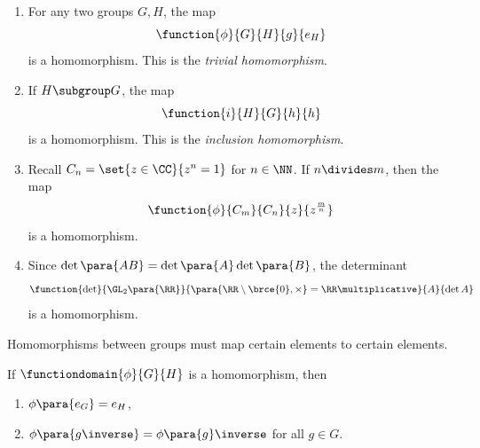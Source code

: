 \begin{examples}
    \begin{enumerate}
        \item For any two groups \(G, H\), the map
        \[
            \function{\phi}{G}{H}{g}{e_{H}}
        \]
        is a homomorphism. This is the \emph{trivial homomorphism}.
        
        \item If \(H \subgroup G\), the map
        \[
            \function{i}{H}{G}{h}{h}
        \]
        is a homomorphism. This is the \emph{inclusion homomorphism}.

        \item Recall \(C_n = \set{z \in \CC}{z^n = 1}\) for \(n \in \NN\). If \(n \divides m\), then the map
        \[
            \function{\phi}{C_m}{C_n}{z}{z^{\frac{m}{n}}}
        \]
        is a homomorphism.

        \item Since \(\det \para{AB} = \det \para{A} \det \para{B}\), the determinant
        \[
            \function{\det}{\GL_2\para{\RR}}{\para{\RR \setminus \brce{0}, \times} = \RR\multiplicative}{A}{\det A}
        \]
        is a homomorphism.
    \end{enumerate}
\end{examples}

Homomorphisms between groups must map certain elements to certain elements.

\begin{lemma}
    \label{lem:homomorphism-preserve-identity-inverse}%
    If \(\functiondomain{\phi}{G}{H}\) is a homomorphism, then
    \begin{enumerate}
        \item \(\phi\para{e_G} = e_H\),
        \item \(\phi\para{g\inverse} = \phi\para{g}\inverse\) for all \(g \in G\).
    \end{enumerate}
\end{lemma}

